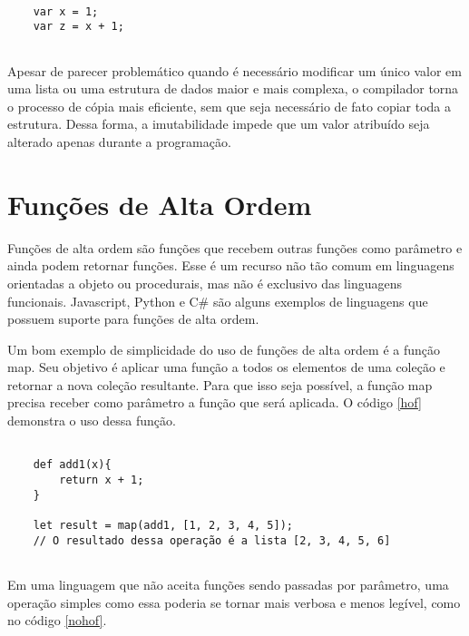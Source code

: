 \begin{lstlisting}[caption={Exemplo de Código Imutável},label=imutablevar]

    var x = 1;
    var z = x + 1;


\end{lstlisting}

Apesar de parecer problemático quando é necessário 
modificar um único valor em uma lista ou uma estrutura 
de dados maior e mais complexa, o compilador torna o 
processo de cópia mais eficiente, sem que seja 
necessário de fato copiar toda a estrutura\cite{functionalscala}. 
Dessa forma, a imutabilidade impede que um valor 
atribuído seja alterado apenas durante a 
programação.


\section{Funções de Alta Ordem}

Funções de alta ordem são funções que recebem 
outras funções como parâmetro e ainda podem 
retornar funções\cite{realworldhaskell, functionalscala}. 
Esse é um recurso 
não tão comum em linguagens orientadas a 
objeto ou procedurais, mas não é exclusivo das 
linguagens funcionais. Javascript\cite{eloquentjs}, 
Python\cite{denerocomposing} e C\#\cite{buonannofunctcsharp}
são alguns exemplos de linguagens que possuem suporte 
para funções de alta ordem.

Um bom exemplo de simplicidade do uso de 
funções de alta ordem é a função map\cite{hofscala}. Seu objetivo 
é aplicar uma função a todos os elementos de uma 
coleção e retornar a nova coleção resultante. 
Para que isso seja possível, a função map precisa 
receber como parâmetro a função que será aplicada. 
O código \ref{hof} demonstra o uso dessa função.

\begin{lstlisting}[caption={Exemplo de Função de Alta Ordem},label=hof]

    def add1(x){
        return x + 1;
    }

    let result = map(add1, [1, 2, 3, 4, 5]);
    // O resultado dessa operação é a lista [2, 3, 4, 5, 6]
        

\end{lstlisting}

Em uma linguagem que não aceita funções sendo 
passadas por parâmetro, uma operação simples como 
essa poderia se tornar mais verbosa e menos legível, 
como no código \ref{nohof}.

